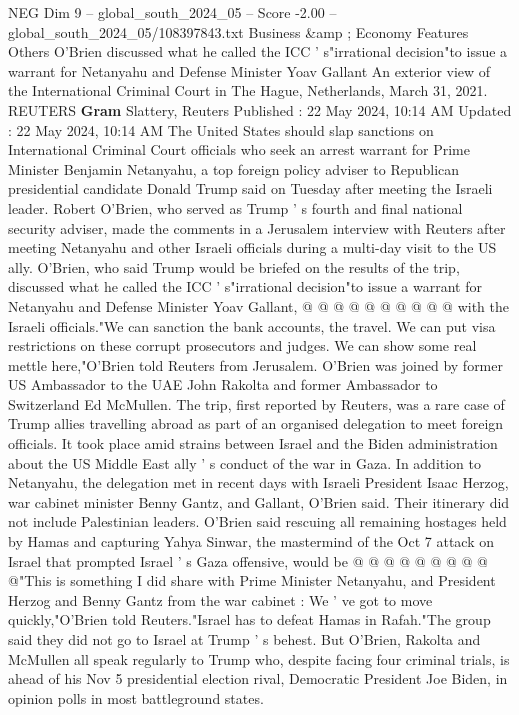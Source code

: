 \begin{textsample}{NEG Dim 9 – global\_south\_2024\_05 – Score -2.00 – global\_south\_2024\_05/108397843.txt}  \label{ex:f9_neg_330}
Business \&amp ; Economy Features Others O'Brien discussed what he called the ICC ' s"irrational decision"to issue a warrant for Netanyahu and Defense Minister Yoav Gallant An exterior view of the International Criminal Court in The Hague, Netherlands, March 31, 2021.
REUTERS \textbf{Gram} Slattery, Reuters Published : 22 May 2024, 10:14 AM Updated : 22 May 2024, 10:14 AM The United States should slap sanctions on International Criminal Court officials who seek an arrest warrant for Prime Minister Benjamin Netanyahu, a top foreign policy adviser to Republican presidential candidate Donald Trump said on Tuesday after meeting the Israeli leader.
Robert O'Brien, who served as Trump ' s fourth and final national security adviser, made the comments in a Jerusalem interview with Reuters after meeting Netanyahu and other Israeli officials during a multi-day visit to the US ally.
O'Brien, who said Trump would be briefed on the results of the trip, discussed what he called the ICC ' s"irrational decision"to issue a warrant for Netanyahu and Defense Minister Yoav Gallant, @ @ @ @ @ @ @ @ @ @ with the Israeli officials."We can sanction the bank accounts, the travel.
We can put visa restrictions on these corrupt prosecutors and judges.
We can show some real mettle here,"O'Brien told Reuters from Jerusalem.
O'Brien was joined by former US Ambassador to the UAE John Rakolta and former Ambassador to Switzerland Ed McMullen.
The trip, first reported by Reuters, was a rare case of Trump allies travelling abroad as part of an organised delegation to meet foreign officials.
It took place amid strains between Israel and the Biden administration about the US Middle East ally ' s conduct of the war in Gaza.
In addition to Netanyahu, the delegation met in recent days with Israeli President Isaac Herzog, war cabinet minister Benny Gantz, and Gallant, O'Brien said.
Their itinerary did not include Palestinian leaders.
O'Brien said rescuing all remaining hostages held by Hamas and capturing Yahya Sinwar, the mastermind of the Oct 7 attack on Israel that prompted Israel ' s Gaza offensive, would be @ @ @ @ @ @ @ @ @ @"This is something I did share with Prime Minister Netanyahu, and President Herzog and Benny Gantz from the war cabinet : We ' ve got to move quickly,"O'Brien told Reuters."Israel has to defeat Hamas in Rafah."The group said they did not go to Israel at Trump ' s behest.
But O'Brien, Rakolta and McMullen all speak regularly to Trump who, despite facing four criminal trials, is ahead of his Nov 5 presidential election rival, Democratic President Joe Biden, in opinion polls in most battleground states.

\end{textsample}
